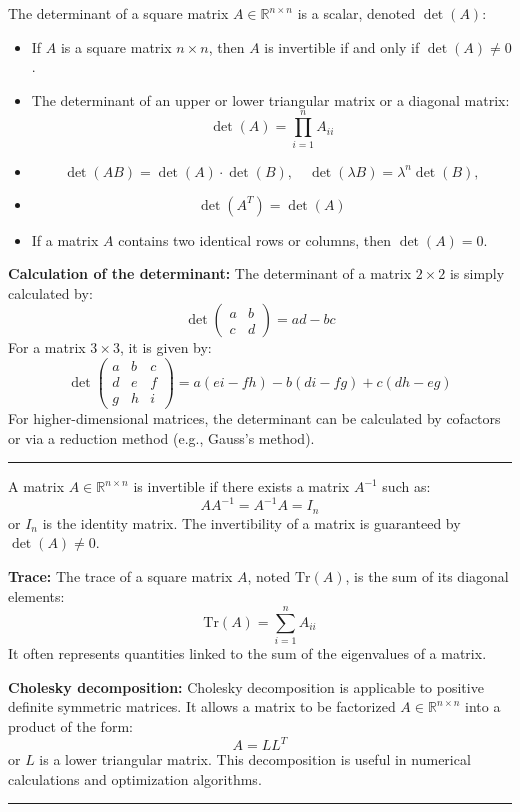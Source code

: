 \begin{f}
  
The determinant of a square matrix \( A \in \mathbb{R}^{n \times n} \) is a scalar, denoted \( \det(A) \):
\begin{itemize}
    \item If \( A \) is a square matrix \( n \times n \), then \( A \) is invertible if and only if \( \det(A) \neq 0 \).
    \item The determinant of an upper or lower triangular matrix or a diagonal matrix:
    \[
    \det(A) = \prod_{i=1}^{n} A_{ii}
    \]
    \item
    \[
    \det(AB) = \det(A) \cdot \det(B),\quad \det(\lambda B) = \lambda^n\det(B), 
    \]
    \item 
    \[
    \det(A^T) = \det(A)
    \]
    \item If a matrix \( A \) contains two identical rows or columns, then \( \det(A) = 0 \).
\end{itemize}

\textbf{Calculation of the determinant:}
The determinant of a matrix \( 2 \times 2 \) is simply calculated by:
\[
\det\begin{pmatrix} a & b \\ c & d \end{pmatrix} = ad - bc
\]
For a matrix \( 3 \times 3 \), it is given by:
\[
\det\begin{pmatrix} a & b & c \\ d & e & f \\ g & h & i \end{pmatrix} = a(ei - fh) - b(di - fg) + c(dh - eg)
\]
For higher-dimensional matrices, the determinant can be calculated by cofactors or via a reduction method (e.g., Gauss's method).

\end{f}
\hrule
\begin{f} 
A matrix \( A \in \mathbb{R}^{n \times n} \) is invertible if there exists a matrix \( A^{-1} \) such as:
\[
A A^{-1} = A^{-1} A = I_n
\]
or \( I_n \) is the identity matrix. The invertibility of a matrix is guaranteed by \( \det(A) \neq 0 \).

\textbf{Trace:}
The trace of a square matrix \( A \), noted \( \text{Tr}(A) \), is the sum of its diagonal elements:
\[
\text{Tr}(A) = \sum_{i=1}^{n} A_{ii}
\]
It often represents quantities linked to the sum of the eigenvalues of a matrix.

\textbf{Cholesky decomposition:}
Cholesky decomposition is applicable to positive definite symmetric matrices. It allows a matrix to be factorized \( A \in \mathbb{R}^{n \times n} \) into a product of the form:
\[
A = LL^T
\]
or \( L \) is a lower triangular matrix. This decomposition is useful in numerical calculations and optimization algorithms.

\end{f}
\hrule

